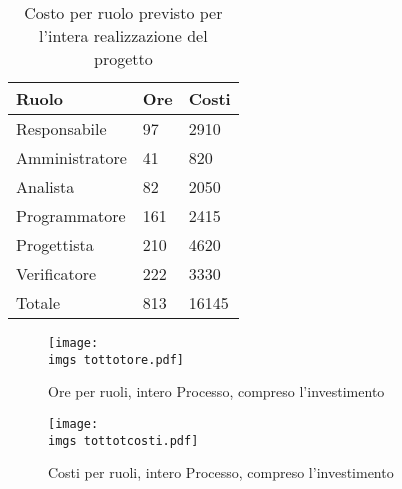 {	
	\begin{table}[H]
	 \centering
	 \begin{tabular}{p{}p{}
		  	  		  				p{}}
	  \toprule Ruolo & Ore  & Costi \\
	  \midrule
	  Responsabile & 97  & 2910 \\
	  Amministratore & 41 & 820 \\
	  Analista & 82 & 2050 \\
	  Programmatore & 161  & 2415 \\
	  Progettista & 210  & 4620 \\
	  Verificatore & 222  & 3330 \\
	  \hline
	  Totale & 813  & 16145 \\
	  \bottomrule
	 \end{tabular}
	 \label{tab:costoinvestimento}
	 \caption{Costo per ruolo previsto per l’intera realizzazione del progetto}
	\end{table}
	
	\begin{figure}[H]
		\centering
		\texttt{[image: \\imgs tottotore.pdf]}
		\label{fig:oreinvestimento}
		\caption{Ore per ruoli, intero Processo, compreso l’investimento}
	\end{figure}
	\begin{figure}[H]
		\centering
		\texttt{[image: \\imgs tottotcosti.pdf]}
		\label{fig:costoinvestimento}
		\caption{Costi per ruoli, intero Processo, compreso l’investimento}
	\end{figure}
}

